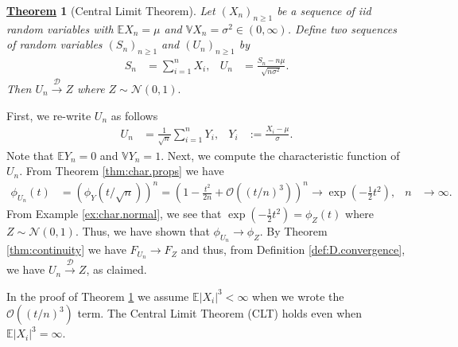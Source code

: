 \documentclass[12pt]{book}
\numberwithin{equation}{chapter}
\theoremstyle{plain}
\newtheorem{theorem}{\underline{Theorem}}
\numberwithin{theorem}{section}
\theoremstyle{definition}
\numberwithin{exercise}{chapter}
\let\oldendproof\endproof
\renewenvironment{proof}[1][\proofname]{%
  \oldproof[\scshape\underline{#1}]%
}{\oldendproof}
\newcommand{\<}{\langle}
\renewcommand{\>}{\rangle}
\renewcommand{\(}{\left(}
\renewcommand{\)}{\right)}
\renewcommand{\[}{\left[}
\renewcommand{\]}{\right]}
\newcommand\Eb{\mathds{E}}
\newcommand\Vb{\mathds{V}}
\newcommand\Dc{\mathscr{D}}
\newcommand\Nc{\mathscr{N}}
\newcommand\Oc{\mathscr{O}}
\newcommand\sig{\sigma}
\begin{document}
\begin{theorem}[Central Limit Theorem]
\label{thm:clt}
Let $(X_n)_{n \geq 1}$ be a sequence of iid random variables with $\Eb X_n = \mu$ and $\Vb X_n = \sig^2 \in (0,\infty)$.  
Define two sequences of random variables $(S_n)_{n \geq 1}$ and $(U_n)_{n \geq 1}$ by
\begin{align}
S_n 
	&= \sum_{i=1}^n X_i , &
U_n 
	&=	\frac{S_n - n \mu}{\sqrt{n \sig^2}} .
\end{align}
Then $U_n \stackrel{\Dc}{\to} Z$ where $Z \sim \Nc(0,1).$
\end{theorem}
\begin{proof}
First, we re-write $U_n$ as follows
\begin{align}
U_n
	&=	\frac{1}{\sqrt{n}} \sum_{i=1}^n Y_i , &
Y_i
	&:=	\frac{X_i - \mu}{ \sig } .
\end{align}
Note that $\Eb Y_n = 0$ and $\Vb Y_n = 1$.  Next, we compute the characteristic function of $U_n$.  From Theorem \ref{thm:char.props} we have
\begin{align}
\phi_{U_n}(t)
	&=	\( \phi_Y(t/\sqrt{n}) \)^n
	=		\( 1 - \frac{ t^2}{2 n} + \Oc((t/n)^3) \)^n
	\to		\exp \( - \frac{1}{2} t^2 \) , &
n
	&\to  \infty .
\end{align}
From Example \ref{ex:char.normal}, we see that $\exp \( - \frac{1}{2} t^2 \) = \phi_Z(t)$ where $Z \sim \Nc(0,1)$.  Thus, we have shown that $\phi_{U_n} \to \phi_Z$.  By Theorem \ref{thm:continuity} we have $F_{U_n} \to F_Z$ and thus, from Definition \ref{def:D.convergence}, we have $U_n \stackrel{\Dc}{\to} Z$, as claimed.
\end{proof}

\noindent
In the proof of Theorem \ref{thm:clt} we assume $\Eb |X_i|^3 < \infty$ when we wrote the $\Oc((t/n)^3)$ term.  The Central Limit Theorem (CLT) holds even when $\Eb |X_i|^3 = \infty$.

\end{document}
